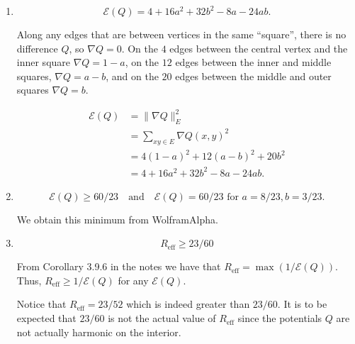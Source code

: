 \documentclass[12 pt, letterpaper]{hmcpset}
\begin{document}
\begin{solution}
	\begin{enumerate}
		\item 
			\[
				\boxed{
					\mathcal{E}(Q) = 4 + 16 a^{2} + 32 b^{2} - 8a - 24 ab.
				}
			\] 

			Along any edges that are between vertices in the same ``square'', there is no difference $Q$, so $\nabla Q = 0$. On the $4$ edges between the central vertex and the inner square $\nabla Q = 1 - a$, on the $12$ edges between the inner and middle squares, $\nabla Q = a - b$, and on the $20$ edges between the middle and outer squares $\nabla Q = b$.

			\begin{align*}
				\mathcal{E}(Q) & = \lVert \nabla Q \rVert_{E}^{2} \\
					       & = \sum_{xy \in E} \nabla Q(x, y)^{2} \\
					       & = 4 (1 - a)^{2} + 12 (a - b)^{2} + 20 b^{2} \\
					       & = 4 + 16 a^{2} + 32 b^{2} - 8a - 24 ab.
			\end{align*}

		\item 
			\[
				\boxed{
					\mathcal{E}(Q) \ge 60 / 23 \quad \text{and} \quad \mathcal{E}(Q) = 60/23 \text{ for } a = 8/23, b = 3/23.
				}
			\]

			We obtain this minimum from WolframAlpha.

		\item 
			\[
				\boxed{
					R_{\text{eff}} \ge 23/60
				}
			\]

			From Corollary 3.9.6 in the notes we have that $R_{\text{eff}} = \max (1 / \mathcal{E}(Q))$. Thus, $R_{\text{eff}} \ge 1 / \mathcal{E}(Q)$ for any $\mathcal{E}(Q)$.

			Notice that $R_{\text{eff}} = 23/52$ which is indeed greater than $23/60$. It is to be expected that  $23 / 60$ is not the actual value of $R_{\text{eff}}$ since the potentials $Q$ are not actually harmonic on the interior.
	\end{enumerate}
\end{solution}

\pagebreak
\end{document}
